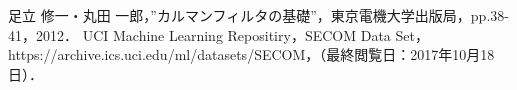 \documentclass[a4paper,11pt]{jarticle}
\begin{document}

\begin{thebibliography}{99}
 足立 修一・丸田 一郎，”カルマンフィルタの基礎”，東京電機大学出版局，pp.38-41，2012．
 UCI Machine Learning Repositiry，SECOM Data Set，https://archive.ics.uci.edu/ml/datasets/SECOM，（最終閲覧日：2017年10月18日）．
\end{thebibliography}
\end{document}
